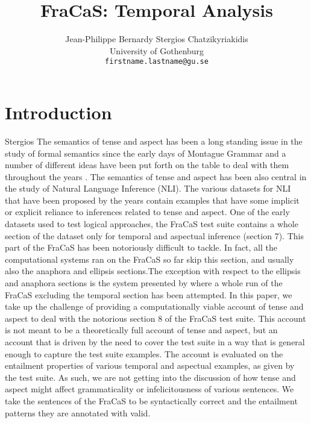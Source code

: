 \documentclass[a4paper,11pt]{article}
\title{FraCaS: Temporal Analysis}
\author{Jean-Philippe Bernardy \qquad Stergios Chatzikyriakidis \\
  University of Gothenburg\\
  {\tt firstname.lastname@gu.se} \\}
\date{}
\begin{document}
\maketitle

\section{Introduction}
Stergios
The semantics of tense and aspect has been a long standing issue in the study of formal semantics since the early days of Montague Grammar and a number of different ideas have been put forth on the table to deal with them throughout the years \citet{dowty:2012,prior:2003,steedman:2000,higginbotham:2009,fernando:2015}. The semantics of tense and aspect has been also central in the study of Natural Language Inference (NLI). The various datasets for NLI that have been proposed by the years contain examples that have some implicit or explicit reliance to inferences related to tense and aspect. One of the early datasets used to test logical approaches, the FraCaS test suite \citet{cooper:1996} contains a whole section of the dataset only for temporal and aspectual inference (section 7). This part of the FraCaS has been notoriously difficult to tackle. In fact, all the computational systems ran on the FraCaS so far skip this section, and usually also the anaphora and ellipsis sections.The exception with respect to the ellipsis and anaphora sections is the system presented by \citet{bernardy_type_2017,bernardy_wide_2019} where a whole run of the FraCaS excluding the temporal section has been attempted. In this paper, we take up the challenge of providing a computationally viable account of tense and aspect to deal with the notorious section 8 of the FraCaS test suite. This account is not meant to be a theoretically full account of tense and aspect, but an account that is driven by the need to cover the test suite in a way that is general enough to capture the test suite examples. The account is evaluated on the entailment properties of various temporal and aspectual examples, as given by the test suite. As such, we are not getting into the discussion of how tense and aspect might affect grammaticality or infelicitousness of various sentences. We take the sentences of the FraCaS to be syntactically correct and the entailment patterns they are annotated with valid. 
\end{document}
